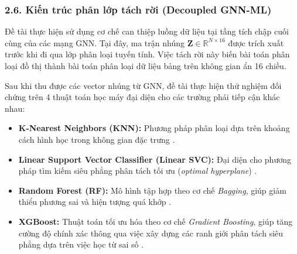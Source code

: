 \subsubsection{2.6. Kiến trúc phân lớp tách rời (Decoupled GNN-ML)}

\indent\indent Đề tài thực hiện sử dụng cơ chế can thiệp luồng dữ liệu tại tầng tích chập cuối cùng của các mạng GNN. Tại đây, ma trận nhúng $\mathbf{Z} \in \mathbb{R}^{N \times 16}$ được trích xuất trước khi đi qua lớp phân loại tuyến tính. Việc tách rời này biến bài toán phân loại đồ thị thành bài toán phân loại dữ liệu bảng trên không gian ẩn 16 chiều.\vspace{0.3cm}

Sau khi thu được các vector nhúng từ GNN, đề tài thực hiện thử nghiệm đối chứng trên 4 thuật toán học máy đại diện cho các trường phái tiếp cận khác nhau:\vspace{-0.1cm}
\begin{itemize}[label={--}, itemsep=1pt]
    \item \textbf{K-Nearest Neighbors (KNN):} Phương pháp phân loại dựa trên khoảng cách hình học trong không gian đặc trưng \cite{cover1967nearest}.
    \item \textbf{Linear Support Vector Classifier (Linear SVC):} Đại diện cho phương pháp tìm kiếm siêu phẳng phân tách tối ưu (\textit{optimal hyperplane}) \cite{cortes1995support}.
    \item \textbf{Random Forest (RF):} Mô hình tập hợp theo cơ chế \textit{Bagging}, giúp giảm thiểu phương sai và hiện tượng quá khớp \cite{breiman2001random}.
    \item \textbf{XGBoost:} Thuật toán tối ưu hóa theo cơ chế \textit{Gradient Boosting}, giúp tăng cường độ chính xác thông qua việc xây dựng các ranh giới phân tách siêu phẳng dựa trên việc học từ sai số \cite{chen2016xgboost}.
\end{itemize}